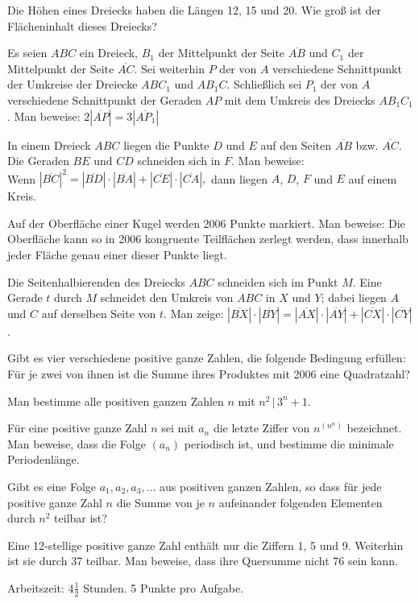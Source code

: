 \documentclass{bw06}
\begin{document}
\begin{problems}
\item Die H{\"o}hen eines Dreiecks haben die L{\"a}ngen 12, 15 und 20. Wie
gro{\ss} ist der Fl{\"a}cheninhalt dieses Dreiecks?

\item  Es seien $ABC$ ein Dreieck, $B_1$ der Mittelpunkt der Seite
$\overline{AB}$ und $C_1$ der Mittelpunkt der Seite
$\overline{AC}$. Sei weiterhin $P$ der von $A$ verschiedene
Schnittpunkt der Umkreise der Dreiecke $ABC_1$ und $AB_1C$.
Schlie{\ss}lich sei $P_1$ der von $A$ verschiedene Schnittpunkt der
Geraden $AP$ mit dem Umkreis des Dreiecks $AB_1C_1$. Man beweise:
$ 2|\overline{AP}| = 3|\overline{AP_1}|$

\item In einem Dreieck $ABC$ liegen die Punkte $D$ und $E$ auf den
Seiten $\overline{AB}$ bzw. $\overline{AC}$. Die Geraden $BE$ und
$CD$ schneiden sich in $F$. Man beweise: \\Wenn $
|\overline{BC}|^2=|\overline{BD}|\cdot
|\overline{BA}|+|\overline{CE}|\cdot |\overline{CA}|,$ dann liegen
$A$, $D$, $F$ und $E$ auf einem Kreis.

\item Auf der Oberfl{\"a}che einer Kugel werden 2006 Punkte markiert.
Man beweise: Die Oberfl{\"a}che kann so in 2006 kongruente Teilfl{\"a}chen
zerlegt werden, dass innerhalb jeder Fl{\"a}che genau einer dieser
Punkte liegt.

\item  Die Seitenhalbierenden des Dreiecks $ABC$ schneiden sich im
Punkt $M$. Eine Gerade $t$ durch $M$ schneidet den Umkreis von
$ABC$ in $X$ und $Y$; dabei liegen $A$ und $C$ auf derselben Seite
von $t$. Man zeige: $|\overline{BX}|\cdot
|\overline{BY}|=|\overline{AX}|\cdot |\overline{AY}| +
|\overline{CX}|\cdot |\overline{CY}|$.

\item Gibt es vier verschiedene positive ganze Zahlen, die
folgende Bedingung erf{\"u}llen: F{\"u}r je zwei von ihnen ist die Summe
ihres Produktes mit 2006 eine Quadratzahl?

\item Man bestimme alle positiven ganzen Zahlen $n$ mit $n^2\,
|\,3^n+1$.

\item F{\"u}r eine positive ganze Zahl $n$ sei mit $a_n$ die letzte
Ziffer von $n^{(n^n)}$ bezeichnet. Man beweise, dass die Folge
$(a_n)$ periodisch ist, und bestimme die minimale Periodenl{\"a}nge.

\item Gibt es eine Folge $a_1,a_2,a_3,\ldots$ aus positiven ganzen
Zahlen, so dass f{\"u}r jede positive ganze Zahl $n$ die Summe von je
$n$ aufeinander folgenden Elementen durch $n^2$ teilbar ist?

\item  Eine 12-stellige positive ganze Zahl enth{\"a}lt nur die
Ziffern 1, 5 und 9. Weiterhin ist sie durch 37 teilbar. Man
beweise, dass ihre Quersumme nicht 76 sein kann.


\end{problems}

Arbeitszeit: $4\frac{1}{2}$ Stunden. 5 Punkte pro Aufgabe.
\end{document}
